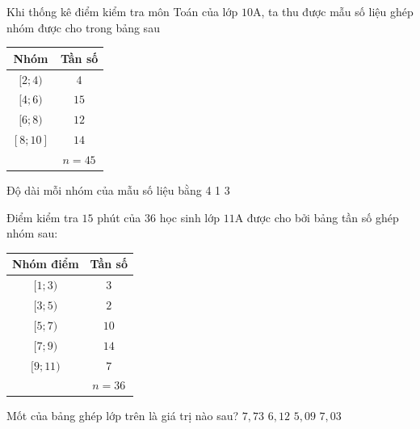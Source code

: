 \begin{ex}%
	Khi thống kê điểm kiểm tra môn Toán của lớp $10\text{A}$, ta thu được mẫu số liệu ghép nhóm được cho  trong bảng sau
	\begin{center}
		\begin{tabular}{|c|c|}
			 \hline
			Nhóm & Tần số  \\
			 \hline
			$[2;4)$ & $4$ \\ 
			 \hline
			 $[4;6)$ & $15$ \\
			\hline 
			$[6;8)$ &  $12$ \\
			 \hline
			$[8;10]$  & $14$ \\
			 \hline
			\multicolumn{1}{|c|}{}& $n=45$  \\
			\hline 
		\end{tabular}
	\end{center}
	Độ dài mỗi nhóm của mẫu số liệu  bằng
	 \choice
		{}
		{4} 
		{1} 
		 {3}
	\loigiai{Xét nhóm $[2;4)$ thì độ dài của  nhóm là $L=4-2=2$.}
\end{ex}

\begin{ex}%
	Điểm kiểm tra $15$ phút của $36$ học sinh lớp  $11$A được cho bởi bảng tần số ghép nhóm sau:
	\begin{center}
		\begin{tabular}{|c|c|}
			\hline 
			Nhóm điểm  & Tần số \\
			 \hline
			$[1; 3)$ & $3$  \\
			\hline 
			 $[3; 5)$ & $2$ \\
			\hline 
			$[5;  7)$ & $10$ \\
			\hline 
			$[7; 9)$ &  $14$ \\
			 \hline
			$[9; 11)$ &  $7$ \\
			 \hline
			& $n=36$  \\
			\hline 
		\end{tabular}
	\end{center}
	Mốt của  bảng ghép lớp trên là giá trị nào sau?
	 \choice
		{\True  $7{,}73$}
		{$6{,}12$} 
		{$5{,}09$} 
		 {$7{,}03$}
\end{ex}

